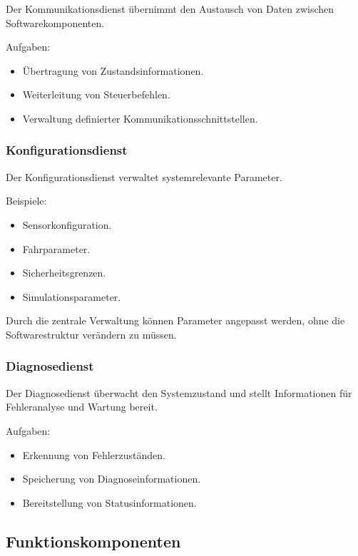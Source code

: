 Der Kommunikationsdienst übernimmt den Austausch von Daten zwischen
Softwarekomponenten.

Aufgaben:

\begin{itemize}
\tightlist
\item
  Übertragung von Zustandsinformationen.
\item
  Weiterleitung von Steuerbefehlen.
\item
  Verwaltung definierter Kommunikationsschnittstellen.
\end{itemize}

\subsubsection{Konfigurationsdienst}\label{konfigurationsdienst}

Der Konfigurationsdienst verwaltet systemrelevante Parameter.

Beispiele:

\begin{itemize}
\tightlist
\item
  Sensorkonfiguration.
\item
  Fahrparameter.
\item
  Sicherheitsgrenzen.
\item
  Simulationsparameter.
\end{itemize}

Durch die zentrale Verwaltung können Parameter angepasst werden, ohne
die Softwarestruktur verändern zu müssen.

\subsubsection{Diagnosedienst}\label{diagnosedienst}

Der Diagnosedienst überwacht den Systemzustand und stellt Informationen
für Fehleranalyse und Wartung bereit.

Aufgaben:

\begin{itemize}
\tightlist
\item
  Erkennung von Fehlerzuständen.
\item
  Speicherung von Diagnoseinformationen.
\item
  Bereitstellung von Statusinformationen.
\end{itemize}

\subsection{Funktionskomponenten}\label{funktionskomponenten}

